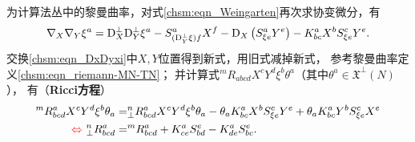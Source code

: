为计算法丛中的黎曼曲率，对式\eqref{chsm:eqn_Weingarten}再次求协变微分，有
\begin{equation}\label{chsm:eqn_DxDyxi}
    {\nabla}_{X} {\nabla}_{Y} \xi^a
        =  {\rm D}_{X}^{\bot} {\rm D}_{Y}^{\bot} \xi^a - S^a_{({\rm D}_{Y}^{\bot} \xi) f} X^f
        - {\rm D}_{X} \left( S^a_{\xi e} Y^e  \right) - K^a_{bc}X^b S^c_{\xi e} Y^e .
\end{equation}
交换\eqref{chsm:eqn_DxDyxi}中$X,Y$位置得到新式，用旧式减掉新式，
参考黎曼曲率定义\eqref{chsm:eqn_riemann-MN-TN}；
并计算式${}^{m}{R}_{abcd} X^c Y^d \xi^b \theta^a$（其中$\theta^a\in \mathfrak{X}^\bot (N)$），
有（{\heiti \bfseries Ricci方程}）
\setlength{\mathindent}{0em}
\begin{subequations}\label{chsm:eqn_Ricci}
\begin{align}
    {}^{m}{R}^a_{bcd} X^c Y^d \xi^b \theta_a =& {}^{n}_{\bot}{R}^a_{bcd} X^c Y^d \xi^b \theta_a
        - \theta_a K^a_{bc}X^b S^c_{\xi e} Y^e   + \theta_a K^a_{bc}Y^b S^c_{\xi e} X^e
        \label{chsm:eqn_Ricci-a} \\    {\color{red}\Leftrightarrow\  }
    {}^{n}_{\bot}{R}^a_{bcd}  =& {}^{m}{R}^a_{bcd} + K^a_{ce} S^e_{b d} - K^a_{de} S^e_{b c}   .
      \label{chsm:eqn_Ricci-b}
\end{align}
\end{subequations}\setlength{\mathindent}{2em}

